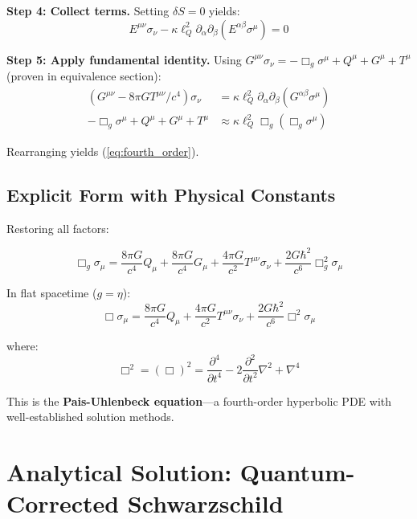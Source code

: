 \documentclass[11pt,a4paper]{article}
\theoremstyle{definition}
\theoremstyle{remark}
\begin{document}
		\textbf{Step 4: Collect terms.}
		Setting $\delta S = 0$ yields:
		\begin{equation}
			E^{\mu\nu}\sigma_\nu - \kappa\ell_Q^2\partial_\alpha\partial_\beta(E^{\alpha\beta}\sigma^\mu) = 0
		\end{equation}
		
		\textbf{Step 5: Apply fundamental identity.}
		Using $G^{\mu\nu}\sigma_\nu = -\Box_g\sigma^\mu + Q^\mu + G^\mu + T^\mu$ (proven in equivalence section):
		\begin{align}
			(G^{\mu\nu} - 8\pi GT^{\mu\nu}/c^4)\sigma_\nu &= \kappa\ell_Q^2\partial_\alpha\partial_\beta(G^{\alpha\beta}\sigma^\mu)\\
			-\Box_g\sigma^\mu + Q^\mu + G^\mu + T^\mu &\approx \kappa\ell_Q^2\Box_g(\Box_g\sigma^\mu)
		\end{align}
		
		Rearranging yields (\ref{eq:fourth_order}).
	
	\subsection{Explicit Form with Physical Constants}
	
	Restoring all factors:
	
	\begin{equation}\label{eq:explicit_fourth_order}
		\boxed{\Box_g\sigma_\mu = \frac{8\pi G}{c^4}Q_\mu + \frac{8\pi G}{c^4}G_\mu + \frac{4\pi G}{c^2}T^{\mu\nu}\sigma_\nu + \frac{2G\hbar^2}{c^6}\Box_g^2\sigma_\mu}
	\end{equation}
	
	In flat spacetime ($g = \eta$):
	\begin{equation}
		\Box\sigma_\mu = \frac{8\pi G}{c^4}Q_\mu + \frac{4\pi G}{c^2}T^{\mu\nu}\sigma_\nu + \frac{2G\hbar^2}{c^6}\Box^2\sigma_\mu
	\end{equation}
	
	where:
	\begin{equation}
		\Box^2 = (\Box)^2 = \frac{\partial^4}{\partial t^4} - 2\frac{\partial^2}{\partial t^2}\nabla^2 + \nabla^4
	\end{equation}
	
	This is the \textbf{Pais-Uhlenbeck equation}—a fourth-order hyperbolic PDE with well-established solution methods.
	
	\section{Analytical Solution: Quantum-Corrected Schwarzschild}
	
\end{document}
